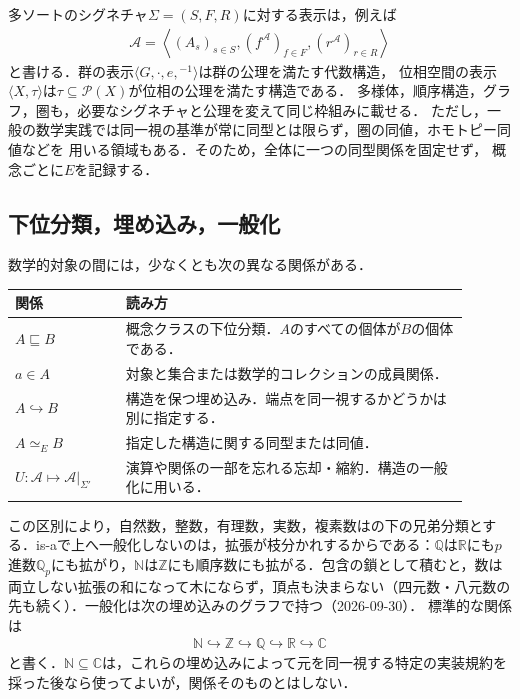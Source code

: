 \documentclass[../../main-detail.tex]{subfiles}
\begin{document}
多ソートのシグネチャ$\Sigma=(S,F,R)$に対する表示は，例えば
\begin{align*}
  \mathcal A
  =
  \left\langle
    (A_s)_{s\in S},
    (f^{\mathcal A})_{f\in F},
    (r^{\mathcal A})_{r\in R}
  \right\rangle
\end{align*}
と書ける．群の表示$\langle G,\cdot,e,{}^{-1}\rangle$は群の公理を満たす代数構造，
位相空間の表示$\langle X,\tau\rangle$は$\tau\subseteq\mathcal P(X)$が位相の公理を満たす構造である．
多様体，順序構造，グラフ，圏も，必要なシグネチャと公理を変えて同じ枠組みに載せる．
ただし，一般の数学実践では同一視の基準が常に同型とは限らず，圏の同値，ホモトピー同値などを
用いる領域もある．そのため，全体に一つの同型関係を固定せず，
概念ごとに$E$を記録する．

\subsection{下位分類，埋め込み，一般化}

数学的対象の間には，少なくとも次の異なる関係がある．
\begin{center}
\begin{tabular}{p{0.22\linewidth}p{0.68\linewidth}}
\toprule
関係 & 読み方 \\
\midrule
$A\sqsubseteq B$ & 概念クラスの下位分類．$A$のすべての個体が$B$の個体である． \\
$a\in A$ & 対象と集合または数学的コレクションの成員関係． \\
$A\hookrightarrow B$ & 構造を保つ埋め込み．端点を同一視するかどうかは別に指定する． \\
$A\simeq_E B$ & 指定した構造に関する同型または同値． \\
$U:\mathcal A\mapsto\mathcal A|_{\Sigma'}$ & 演算や関係の一部を忘れる忘却・縮約．構造の一般化に用いる． \\
\bottomrule
\end{tabular}
\end{center}

この区別により，自然数，整数，有理数，実数，複素数はの下の兄弟分類とする．is-aで上へ一般化しないのは，拡張が枝分かれするからである：$\mathbb Q$は$\mathbb R$にも$p$進数$\mathbb Q_p$にも拡がり，$\mathbb N$は$\mathbb Z$にも順序数にも拡がる．包含の鎖として積むと，数は両立しない拡張の和になって木にならず，頂点も決まらない（四元数・八元数の先も続く）．一般化は次の埋め込みのグラフで持つ（2026-09-30）．
標準的な関係は
\begin{align*}
  \mathbb N\hookrightarrow\mathbb Z\hookrightarrow\mathbb Q
  \hookrightarrow\mathbb R\hookrightarrow\mathbb C
\end{align*}
と書く．$\mathbb N\subseteq\mathbb C$は，これらの埋め込みによって元を同一視する特定の実装規約を
採った後なら使ってよいが，関係そのものとはしない．
\end{document}
